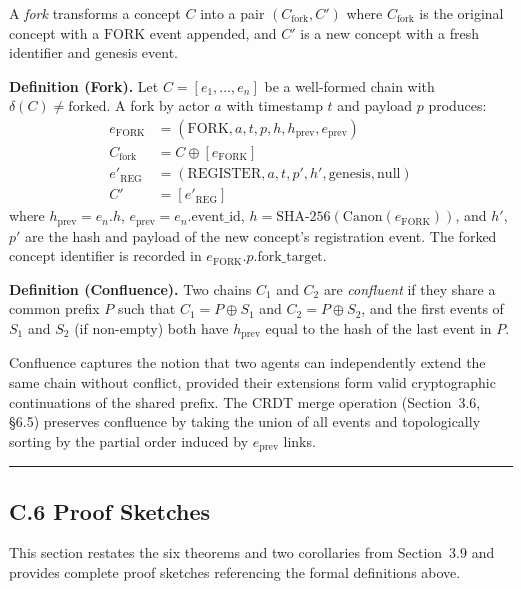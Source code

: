 A \emph{fork} transforms a concept $C$ into a pair $(C_{\text{fork}}, C')$ where $C_{\text{fork}}$ is the original concept with a $\text{FORK}$ event appended, and $C'$ is a new concept with a fresh identifier and genesis event.

\textbf{Definition (Fork).} Let $C = [e_1, \ldots, e_n]$ be a well-formed chain with $\delta(C) \neq \text{forked}$. A fork by actor $a$ with timestamp $t$ and payload $p$ produces:
\begin{align}
e_{\text{FORK}} &= (\text{FORK}, a, t, p, h, h_{\text{prev}}, e_{\text{prev}}) \\
C_{\text{fork}} &= C \oplus [e_{\text{FORK}}] \\
e'_{\text{REG}} &= (\text{REGISTER}, a, t, p', h', \text{genesis}, \text{null}) \\
C' &= [e'_{\text{REG}}]
\end{align}
where $h_{\text{prev}} = e_n.h$, $e_{\text{prev}} = e_n.\text{event\_id}$, $h = \text{SHA-256}(\text{Canon}(e_{\text{FORK}}))$, and $h'$, $p'$ are the hash and payload of the new concept's registration event. The forked concept identifier is recorded in $e_{\text{FORK}}.p.\text{fork\_target}$.

\textbf{Definition (Confluence).} Two chains $C_1$ and $C_2$ are \emph{confluent} if they share a common prefix $P$ such that $C_1 = P \oplus S_1$ and $C_2 = P \oplus S_2$, and the first events of $S_1$ and $S_2$ (if non-empty) both have $h_{\text{prev}}$ equal to the hash of the last event in $P$.

Confluence captures the notion that two agents can independently extend the same chain without conflict, provided their extensions form valid cryptographic continuations of the shared prefix. The CRDT merge operation (Section~3.6, §6.5) preserves confluence by taking the union of all events and topologically sorting by the partial order induced by $e_{\text{prev}}$ links.

\begin{center}\rule{0.5\linewidth}{0.5pt}\end{center}


\subsection{C.6 Proof Sketches}\label{c.6-proof-sketches}

This section restates the six theorems and two corollaries from Section~3.9 and provides complete proof sketches referencing the formal definitions above.

